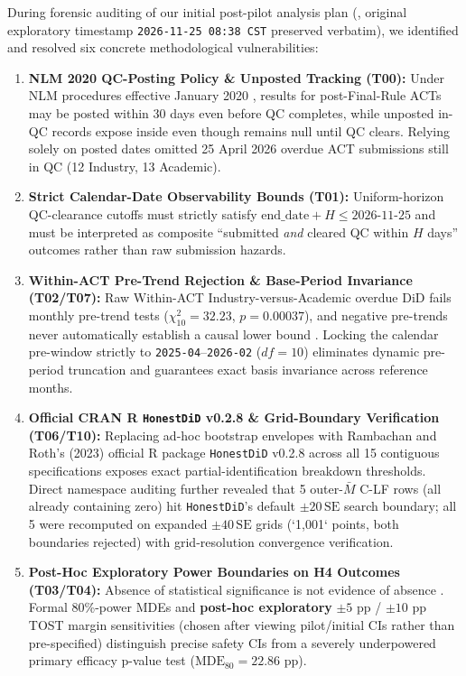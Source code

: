 \documentclass[11pt,letterpaper]{article}
\begin{document}
During forensic auditing of our initial post-pilot analysis plan (, original exploratory timestamp \texttt{2026-11-25 08:38 CST} preserved verbatim), we identified and resolved six concrete methodological vulnerabilities:
\begin{enumerate}
    \item \textbf{NLM 2020 QC-Posting Policy \& Unposted Tracking (T00):} Under NLM procedures effective January 2020 \citep{nlm2020qc}, results for post-Final-Rule ACTs may be posted within 30 days even before QC completes, while unposted in-QC records expose  inside  even though  remains null until QC clears. Relying solely on posted dates omitted 25 April 2026 overdue ACT submissions still in QC (12 Industry, 13 Academic).
    \item \textbf{Strict Calendar-Date Observability Bounds (T01):} Uniform-horizon QC-clearance cutoffs must strictly satisfy $\text{end\_date}+H\le\text{2026-11-25}$ and must be interpreted as composite ``submitted \textit{and} cleared QC within $H$ days'' outcomes rather than raw submission hazards.
    \item \textbf{Within-ACT Pre-Trend Rejection \& Base-Period Invariance (T02/T07):} Raw Within-ACT Industry-versus-Academic overdue DiD fails monthly pre-trend tests ($\chi^2_{10}=32.23$, $p=0.00037$), and negative pre-trends never automatically establish a causal lower bound \citep{roth2022}. Locking the calendar pre-window strictly to \texttt{2025-04}--\texttt{2026-02} ($df=10$) eliminates dynamic pre-period truncation and guarantees exact basis invariance across reference months.
    \item \textbf{Official CRAN R \texttt{HonestDiD} v0.2.8 \& Grid-Boundary Verification (T06/T10):} Replacing ad-hoc bootstrap envelopes with Rambachan and Roth's (2023) official R package \texttt{HonestDiD} v0.2.8 \citep{rambachan2023} across all 15 contiguous specifications exposes exact partial-identification breakdown thresholds. Direct namespace auditing further revealed that 5 outer-$\bar{M}$ C-LF rows (all already containing zero) hit \texttt{HonestDiD}'s default $\pm 20\,\mathrm{SE}$ search boundary; all 5 were recomputed on expanded $\pm 40\,\mathrm{SE}$ grids (`1,001` points, both boundaries rejected) with grid-resolution convergence verification.
    \item \textbf{Post-Hoc Exploratory Power Boundaries on H4 Outcomes (T03/T04):} Absence of statistical significance is not evidence of absence \citep{altman1995}. Formal 80\%-power MDEs and \textbf{post-hoc exploratory} $\pm 5$ pp / $\pm 10$ pp TOST margin sensitivities (chosen after viewing pilot/initial CIs rather than pre-specified) distinguish precise safety CIs from a severely underpowered primary efficacy p-value test ($\mathrm{MDE}_{80}=22.86$ pp).
\end{enumerate}
\end{document}
